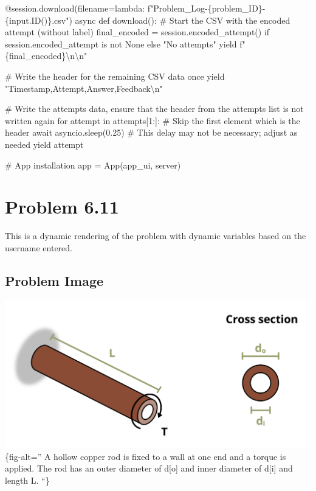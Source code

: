 \documentclass[
  letterpaper,
  DIV=11,
  numbers=noendperiod]{scrreprt}
\newenvironment{Shaded}{\begin{snugshade}}{\end{snugshade}}
\newcommand{\NormalTok}[1]{\textcolor[rgb]{0.00,0.23,0.31}{#1}}
\begin{document}
\begin{Shaded}
\begin{Highlighting}[]
\NormalTok{    @session.download(filename=lambda: f"Problem\_Log{-}\{problem\_ID\}{-}\{input.ID()\}.csv")}
\NormalTok{    async def download():}
\NormalTok{        \# Start the CSV with the encoded attempt (without label)}
\NormalTok{        final\_encoded = session.encoded\_attempt() if session.encoded\_attempt is not None else "No attempts"}
\NormalTok{        yield f"\{final\_encoded\}\textbackslash{}n\textbackslash{}n"}
        
\NormalTok{        \# Write the header for the remaining CSV data once}
\NormalTok{        yield "Timestamp,Attempt,Answer,Feedback\textbackslash{}n"}
        
\NormalTok{        \# Write the attempts data, ensure that the header from the attempts list is not written again}
\NormalTok{        for attempt in attempts[1:]:  \# Skip the first element which is the header}
\NormalTok{            await asyncio.sleep(0.25)  \# This delay may not be necessary; adjust as needed}
\NormalTok{            yield attempt}


\NormalTok{\# App installation}
\NormalTok{app = App(app\_ui, server)}
\end{Highlighting}
\end{Shaded}

\chapter*{Problem 6.11}\label{problem-6.11}


This is a dynamic rendering of the problem with dynamic variables based
on the username entered.

\section*{Problem Image}\label{problem-image-64}


\includegraphics{images/266.png}\{fig-alt='' A hollow copper rod is
fixed to a wall at one end and a torque is applied. The rod has an outer
diameter of d{[}o{]} and inner diameter of d{[}i{]} and length L. ``\}
\end{document}
